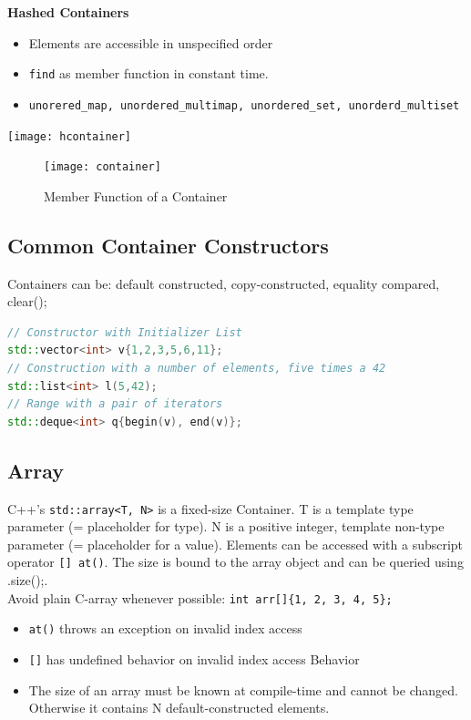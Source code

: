 \begin{minipage}{0,5\linewidth}
	\textbf{Hashed Containers}
	\begin{itemize}
		\item Elements are accessible in unspecified order
		\item \lstinline|find| as member function in constant time.
		\item \lstinline|unorered_map, unordered_multimap, unordered_set, unorderd_multiset|
	\end{itemize}  
\end{minipage}
\begin{minipage}{0,5\linewidth}
	\center
	\texttt{[image: hcontainer]}  
\end{minipage}


\begin{figure}[h!]
  \centering
  \texttt{[image: container]}
  \caption{Member Function of a Container}
\end{figure}

\subsection{Common Container Constructors}
Containers can be: default constructed, copy-constructed, equality compared, clear();
\begin{lstlisting}[language=C++]
// Constructor with Initializer List
std::vector<int> v{1,2,3,5,6,11};
// Construction with a number of elements, five times a 42
std::list<int> l(5,42);
// Range with a pair of iterators
std::deque<int> q{begin(v), end(v)};
\end{lstlisting}

\subsection{Array}
C++'s \lstinline|std::array<T, N>| is a fixed-size Container. T is a template type parameter (= placeholder for type). N is a positive integer, template non-type parameter (= placeholder for a value). Elements can be accessed with a subscript operator \lstinline|[] at()|. The size is bound to the array object and can be queried using .size();. \\
Avoid plain C-array whenever possible: \lstinline|int arr[]{1, 2, 3, 4, 5};|
\begin{itemize}
  \itemsep -0.5em 
  \item \lstinline|at()| throws an exception on invalid index access
  \item \lstinline|[]| has undefined behavior on invalid index access Behavior
  \item The size of an array must be known at compile-time and cannot be changed. Otherwise it contains N default-constructed elements.
\end{itemize}

